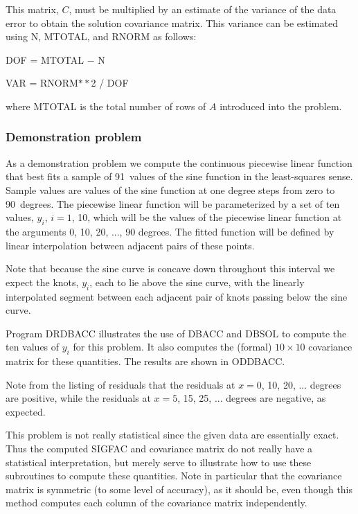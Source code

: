 \documentclass[twoside]{MATH77}
\begin{document}
This matrix, $C$, must be multiplied by an estimate of the variance of the
data error to obtain the solution covariance matrix. This variance can be
estimated using N, MTOTAL, and RNORM as follows:

\hspace{.2in}DOF = MTOTAL $-$ N

\hspace{.2in}VAR = RNORM$**$2 / DOF

where MTOTAL is the total number of rows of $A$ introduced into the problem.

\subsubsection{Demonstration problem}

As a demonstration problem we compute the continuous piecewise linear
function that best fits a sample of 91~values of the sine function in the
least-squares sense. Sample values are values of the sine function at one
degree steps from zero to 90~degrees. The piecewise linear function will be
parameterized by a set of ten values, $y_i$, $i = 1$, 10, which will be the
values of the piecewise linear function at the arguments 0, 10, 20, ..., 90
degrees. The fitted function will be defined by linear interpolation between
adjacent pairs of these points.

Note that because the sine curve is concave down throughout this interval we
expect the knots, $y_i$, each to lie above the sine curve, with the linearly
interpolated segment between each adjacent pair of knots passing below the
sine curve.

Program DRDBACC illustrates the use of DBACC and DBSOL to compute the ten
values of $y_i$ for this problem. It also computes the (formal) $10\times 10$
covariance matrix for these quantities. The results are shown in ODDBACC.

Note from the listing of residuals that the residuals at $x = 0$, 10, 20,
... degrees are positive, while the residuals at $x = 5$, 15, 25, ...
degrees are negative, as expected.

This problem is not really statistical since the given data are essentially
exact. Thus the computed SIGFAC and covariance matrix do not really have a
statistical interpretation, but merely serve to illustrate how to use these
subroutines to compute these quantities. Note in particular that the
covariance matrix is symmetric (to some level of accuracy), as it should be,
even though this method computes each column of the covariance matrix
independently.
\end{document}
